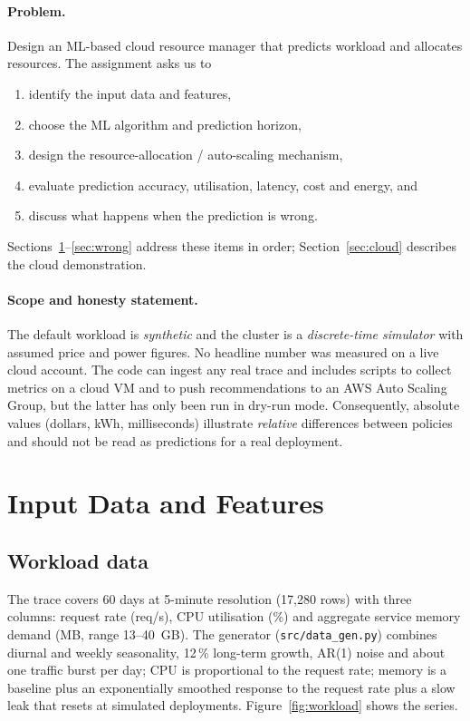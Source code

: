 \documentclass[11pt,a4paper]{article}
\begin{document}
\paragraph{Problem.} Design an ML-based cloud resource manager that predicts workload and allocates resources. The assignment asks us to
\begin{enumerate}[label=(\roman*)]
  \item identify the input data and features,
  \item choose the ML algorithm and prediction horizon,
  \item design the resource-allocation / auto-scaling mechanism,
  \item evaluate prediction accuracy, utilisation, latency, cost and energy, and
  \item discuss what happens when the prediction is wrong.
\end{enumerate}
Sections~\ref{sec:data}--\ref{sec:wrong} address these items in order; Section~\ref{sec:cloud} describes the cloud demonstration.

\paragraph{Scope and honesty statement.} The default workload is \emph{synthetic} and the cluster is a \emph{discrete-time simulator} with assumed price and power figures. No headline number was measured on a live cloud account. The code can ingest any real trace and includes scripts to collect metrics on a cloud VM and to push recommendations to an AWS Auto Scaling Group, but the latter has only been run in dry-run mode. Consequently, absolute values (dollars, kWh, milliseconds) illustrate \emph{relative} differences between policies and should not be read as predictions for a real deployment.

\section{Input Data and Features}\label{sec:data}
\subsection{Workload data}
The trace covers 60 days at 5-minute resolution (17{,}280 rows) with three columns: request rate (req/s), CPU utilisation (\%) and aggregate service memory demand (MB, range 13--40~GB). The generator (\texttt{src/data\_gen.py}) combines diurnal and weekly seasonality, 12\,\% long-term growth, AR(1) noise and about one traffic burst per day; CPU is proportional to the request rate; memory is a baseline plus an exponentially smoothed response to the request rate plus a slow leak that resets at simulated deployments. Figure~\ref{fig:workload} shows the series.
\end{document}
